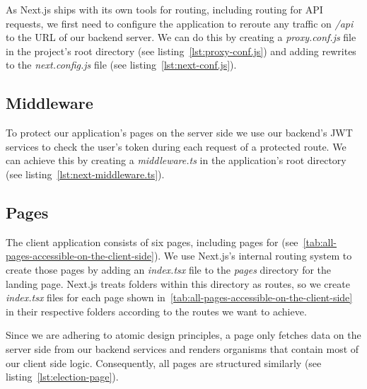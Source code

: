 As Next.js ships with its own tools for routing, including routing for \gls{API} requests, we first need to configure the application to reroute any traffic on \emph{/api} to the \gls{URL} of our backend server.
We can do this by creating a \emph{proxy.conf.js} file in the project's root directory (see listing~\ref{lst:proxy-conf.js}) and adding rewrites to the \emph{next.config.js} file (see listing~\ref{lst:next-conf.js}).


\subsection{Middleware}\label{subsec:middleware}

To protect our application's pages on the server side we use our backend's \gls{JWT} services to check the user's token during each request of a protected route.
We can achieve this by creating a \emph{middleware.ts} in the application's root directory (see listing~\ref{lst:next-middleware.ts}).


\subsection{Pages}\label{subsec:pages}


The client application consists of six pages, including pages for  (see~\cref{tab:all-pages-accessible-on-the-client-side}).
We use Next.js's internal routing system to create those pages by adding an \emph{index.tsx} file to the \emph{pages} directory for the landing page.
Next.js treats folders within this directory as routes, so we create \emph{index.tsx} files for each page shown in~\cref{tab:all-pages-accessible-on-the-client-side} in their respective folders according to the routes we want to achieve.

Since we are adhering to atomic design principles, a page only fetches data on the server side from our backend services and renders organisms that contain most of our client side logic.
Consequently, all pages are structured similarly (see listing~\ref{lst:election-page}).

